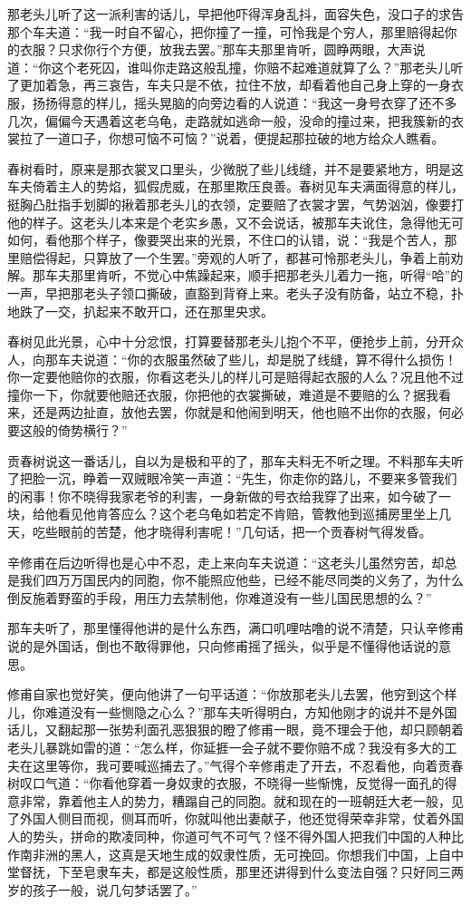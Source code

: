 \documentclass[12pt,UTF8]{ctexbook}
\begin{document}
{{{那老头儿听了这一派利害的话儿，早把他吓得浑身乱抖，面容失色，没口子的求告那个车夫道：“我一时自不留心，把你撞了一撞，可怜我是个穷人，那里赔得起你的衣服？只求你行个方便，放我去罢。”那车夫那里肯听，圆睁两眼，大声说道：“你这个老死囚，谁叫你走路这般乱撞，你赔不起难道就算了么？”那老头儿听了更加着急，再三哀告，车夫只是不依，拉住不放，却看着他自己身上穿的一身衣服，扬扬得意的样儿，摇头晃脑的向旁边看的人说道：“我这一身号衣穿了还不多几次，偏偏今天遇着这老乌龟，走路就如逃命一般，没命的撞过来，把我簇新的衣裳拉了一道口子，你想可恼不可恼？”说着，便提起那拉破的地方给众人瞧看。

春树看时，原来是那衣裳叉口里头，少微脱了些儿线缝，并不是要紧地方，明是这车夫倚着主人的势焰，狐假虎威，在那里欺压良善。春树见车夫满面得意的样儿，挺胸凸肚指手划脚的揪着那老头儿的衣领，定要赔了衣裳才罢，气势汹汹，像要打他的样子。这老头儿本来是个老实乡愚，又不会说话，被那车夫讹住，急得他无可如何，看他那个样子，像要哭出来的光景，不住口的认错，说：“我是个苦人，那里赔偿得起，只算放了一个生罢。”旁观的人听了，都甚可怜那老头儿，争着上前劝解。那车夫那里肯听，不觉心中焦躁起来，顺手把那老头儿着力一拖，听得“哈”的一声，早把那老头子领口撕破，直豁到背脊上来。老头子没有防备，站立不稳，扑地跌了一交，扒起来不敢开口，还在那里央求。

春树见此光景，心中十分忿恨，打算要替那老头儿抱个不平，便抢步上前，分开众人，向那车夫说道：“你的衣服虽然破了些儿，却是脱了线缝，算不得什么损伤！你一定要他赔你的衣服，你看这老头儿的样儿可是赔得起衣服的人么？况且他不过撞你一下，你就要他赔还衣服，你把他的衣裳撕破，难道是不要赔的么？据我看来，还是两边扯直，放他去罢，你就是和他闹到明天，他也赔不出你的衣服，何必要这般的倚势横行？”

贡春树说这一番话儿，自以为是极和平的了，那车夫料无不听之理。不料那车夫听了把脸一沉，睁着一双贼眼冷笑一声道：“先生，你走你的路儿，不要来多管我们的闲事！你不晓得我家老爷的利害，一身新做的号衣给我穿了出来，如今破了一块，给他看见他肯答应么？这个老乌龟如若定不肯赔，管教他到巡捕房里坐上几天，吃些眼前的苦楚，他才晓得利害呢！”几句话，把一个贡春树气得发昏。

辛修甫在后边听得也是心中不忍，走上来向车夫说道：“这老头儿虽然穷苦，却总是我们四万万国民内的同胞，你不能照应他些，已经不能尽同类的义务了，为什么倒反施着野蛮的手段，用压力去禁制他，你难道没有一些儿国民思想的么？”

那车夫听了，那里懂得他讲的是什么东西，满口叽哩咕噜的说不清楚，只认辛修甫说的是外国话，倒也不敢得罪他，只向修甫摇了摇头，似乎是不懂得他话说的意思。

修甫自家也觉好笑，便向他讲了一句平话道：“你放那老头儿去罢，他穷到这个样儿，你难道没有一些恻隐之心么？”那车夫听得明白，方知他刚才的说并不是外国话儿，又翻起那一张势利面孔恶狠狠的瞪了修甫一眼，竟不理会于他，却只顾朝着老头儿暴跳如雷的道：“怎么样，你延捱一会子就不要你赔不成？我没有多大的工夫在这里等你，我可要喊巡捕去了。”气得个辛修甫走了开去，不忍看他，向着贡春树叹口气道：“你看他穿着一身奴隶的衣服，不晓得一些惭愧，反觉得一面孔的得意非常，靠着他主人的势力，糟蹋自己的同胞。就和现在的一班朝廷大老一般，见了外国人侧目而视，侧耳而听，你就叫他出妻献子，他还觉得荣幸非常，仗着外国人的势头，拼命的欺凌同种，你道可气不可气？怪不得外国人把我们中国的人种比作南非洲的黑人，这真是天地生成的奴隶性质，无可挽回。你想我们中国，上自中堂督抚，下至皂隶车夫，都是这般性质，那里还讲得到什么变法自强？只好同三两岁的孩子一般，说几句梦话罢了。”

}}}
\end{document}
